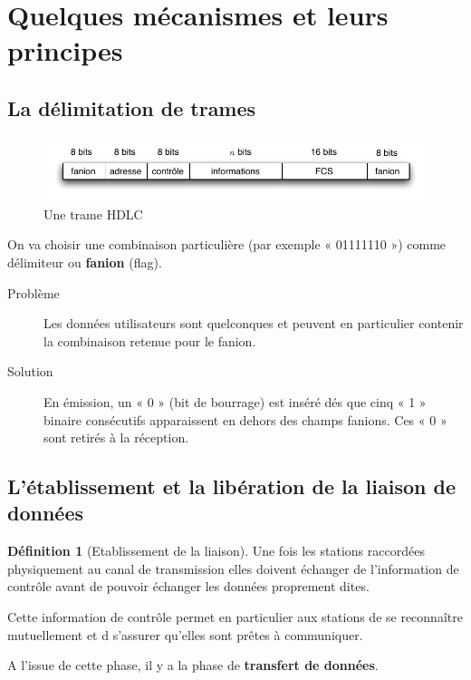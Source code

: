 \documentclass[11pt,english,french]{scrreprt}
\theoremstyle{remark}
\theoremstyle{definition}
\newtheorem*{def*}{Définition}
\begin{document}
\section{Quelques mécanismes et leurs principes} %

\subsection*{La délimitation de trames} %

\begin{figure}[h!]
	\center
	\includegraphics[scale=.7]{graphes/trame}
	\caption{Une trame HDLC}
\end{figure}

On va choisir une combinaison particulière (par exemple « 01111110 ») comme délimiteur ou \textbf{fanion} (flag).

\begin{description}
	\item[Problème] Les données utilisateurs sont quelconques et peuvent en particulier contenir la combinaison retenue pour le fanion.
	\item[Solution] En émission, un « 0 » (bit de bourrage) est inséré dés que cinq « 1 » binaire consécutifs apparaissent en dehors des champs fanions. Ces « 0 » sont retirés à la réception.
\end{description}

\subsection*{L'établissement et la libération de la liaison de données} %

\begin{def*}[Etablissement de la liaison]
	Une fois les stations raccordées physiquement au canal de transmission elles doivent échanger de l'information de contrôle avant de pouvoir échanger les données proprement dites. 
	
	Cette information de contrôle permet en particulier aux stations de se reconnaître mutuellement et d s'assurer qu'elles sont prêtes à communiquer. 
\end{def*}

A l'issue de cette phase, il y a la phase de \textbf{transfert de données}.
\end{document}
